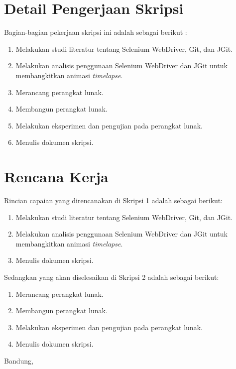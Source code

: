 \documentclass[a4paper,twoside]{article}
\begin{document}
\section{Detail Pengerjaan Skripsi}
Bagian-bagian pekerjaan skripsi ini adalah sebagai berikut :
	\begin{enumerate}
		\item Melakukan studi literatur tentang Selenium WebDriver, Git, dan JGit.
		\item Melakukan analisis penggunaan Selenium WebDriver dan JGit untuk membangkitkan animasi \textit{timelapse}.
		\item Merancang perangkat lunak.
		\item Membangun perangkat lunak.
		\item Melakukan eksperimen dan pengujian pada perangkat lunak.
		\item Menulis dokumen skripsi.
	\end{enumerate}

\section{Rencana Kerja}
Rincian capaian yang direncanakan di Skripsi 1 adalah sebagai berikut:
\begin{enumerate}
\item Melakukan studi literatur tentang Selenium WebDriver, Git, dan JGit.
\item Melakukan analisis penggunaan Selenium WebDriver dan JGit untuk membangkitkan animasi \textit{timelapse}.
\item Menulis dokumen skripsi.
\end{enumerate}

Sedangkan yang akan diselesaikan di Skripsi 2 adalah sebagai berikut:
\begin{enumerate}
\item Merancang perangkat lunak.
\item Membangun perangkat lunak.
\item Melakukan eksperimen dan pengujian pada perangkat lunak.
\item Menulis dokumen skripsi. 
\end{enumerate}

\vspace{1cm}
\centering Bandung, \tanggal\\
\vspace{2cm} \nama \\ 
\vspace{1cm}
\end{document}

